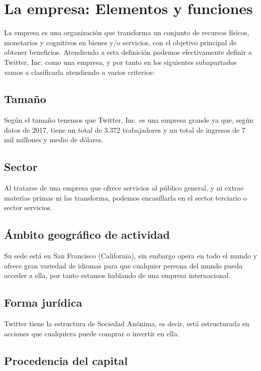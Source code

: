 \section{La empresa: Elementos y funciones}

La empresa es una organización que transforma un conjunto de recursos físicos, monetarios y cognitivos en bienes y/o servicios, con el objetivo principal de obtener beneficios.
Atendiendo a esta definición podemos efectivamente definir a Twitter, Inc. como una empresa, y por tanto en los siguientes subapartados vamos a clasificarla atendiendo a varios criterios:

\subsection{Tamaño}

Según el tamaño tenemos que Twitter, Inc. es una empresa grande ya que, según datos de 2017, tiene un total de 3.372 trabajadores y un total de ingresos de 7 mil millones y medio de dólares.

\subsection{Sector}

Al tratarse de una empresa que ofrece servicios al público general, y ni extrae materias primas ni las transforma, podemos encasillarla en el sector terciario o sector servicios.

\subsection{Ámbito geográfico de actividad}

Su sede está en San Francisco (California), sin embargo opera en todo el mundo y ofrece gran variedad de idiomas para que cualquier persona del mundo pueda acceder a ella, por tanto estamos hablando de una empresa internacional.

\subsection{Forma jurídica}

Twitter tiene la estructura de Sociedad Anónima, es decir, está estructurada en acciones que cualquiera puede comprar o invertir en ella.

\subsection{Procedencia del capital}

